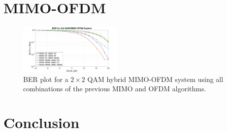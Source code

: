 \documentclass[journal]{IEEEtran}
\begin{document}
\section{MIMO-OFDM} \label{sec:MIMO-OFDM}

\begin{figure}[!htbp]
    \centering
    \includegraphics[width = 0.45\textwidth]{MIMOOFDM.jpg}
    \caption{BER plot for a $2\times2$ QAM hybrid MIMO-OFDM system using all combinations of the previous MIMO and OFDM algorithms.}
    \label{fig:mimoofdm_res}
\end{figure}

\section{Conclusion} \label{sec:conc}


\end{document}
